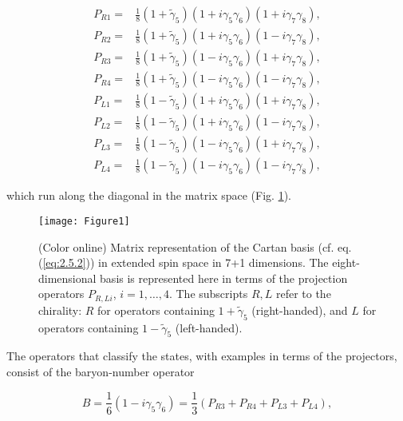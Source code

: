 \documentclass[12pt]{article}
\renewcommand\[{\begin{dmath}}
\renewcommand\]{\end{dmath}}
\begin{document}
\begin{equation}
\begin{array}{cc}
P_{R1}= & \frac{1}{8}(1+\tilde{\gamma}_{5})(1+i\gamma_{5}\gamma_{6})(1+i\gamma_{7}\gamma_{8}),\\
P_{R2}= & \frac{1}{8}(1+\tilde{\gamma}_{5})(1+i\gamma_{5}\gamma_{6})(1-i\gamma_{7}\gamma_{8}),\\
P_{R3}= & \frac{1}{8}(1+\tilde{\gamma}_{5})(1-i\gamma_{5}\gamma_{6})(1+i\gamma_{7}\gamma_{8}),\\
P_{R4}= & \frac{1}{8}(1+\tilde{\gamma}_{5})(1-i\gamma_{5}\gamma_{6})(1-i\gamma_{7}\gamma_{8}),\\
P_{L1}= & \frac{1}{8}(1-\tilde{\gamma}_{5})(1+i\gamma_{5}\gamma_{6})(1+i\gamma_{7}\gamma_{8}),\\
P_{L2}= & \frac{1}{8}(1-\tilde{\gamma}_{5})(1+i\gamma_{5}\gamma_{6})(1-i\gamma_{7}\gamma_{8}),\\
P_{L3}= & \frac{1}{8}(1-\tilde{\gamma}_{5})(1-i\gamma_{5}\gamma_{6})(1+i\gamma_{7}\gamma_{8}),\\
P_{L4}= & \frac{1}{8}(1-\tilde{\gamma}_{5})(1-i\gamma_{5}\gamma_{6})(1-i\gamma_{7}\gamma_{8}),
\end{array}\label{eq:2.5.3}
\end{equation}

\noindent which run along the diagonal in the matrix space (Fig. \ref{projections}).

\begin{figure}[H]
\begin{centering}
\texttt{[image: Figure1]}
\par\end{centering}
\caption{(Color online) Matrix representation of the Cartan basis (cf. eq.
(\ref{eq:2.5.2})) in extended spin space in 7+1 dimensions. The eight-dimensional
basis is represented here in terms of the projection operators $P_{R,Li}$,
$i=1,\ldots,4.$ The subscripts $R,L$ refer to the chirality: $R$
for operators containing $1+\tilde{\gamma}_{5}$ (right-handed), and
$L$ for operators containing $1-\tilde{\gamma}_{5}$ (left-handed).}   \label{projections}
\end{figure}

The operators that classify the states, with examples in terms of the projectors,   consist of the baryon-number
operator

\begin{equation}
B=\frac{1}{6}(1-i\gamma_{5}\gamma_{6})=\dfrac{1}{3}(P_{R3}+P_{R4}+P_{L3}+P_{L4}),\label{eq:2.5.4}
\end{equation}
\end{document}
